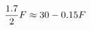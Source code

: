 \documentclass[preview]{standalone}
\begin{document}
\begin{align*}
\special{dvisvgm:raw <g id='unique000'>}\frac{1.7}{2}F \approx 30 - 0.15F\special{dvisvgm:raw </g>}
\end{align*}
\end{document}
